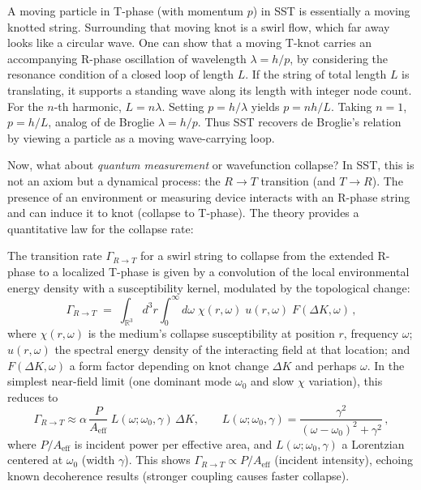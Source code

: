 \documentclass[reprint,aps,onecolumn,nofootinbib]{revtex4-2}
\begin{document}
	A moving particle in T-phase (with momentum $p$) in SST is essentially a moving knotted string. Surrounding that moving knot is a swirl flow, which far away looks like a circular wave. One can show that a moving T-knot carries an accompanying R-phase oscillation of wavelength $\lambda = h/p$, by considering the resonance condition of a closed loop of length $L$. If the string of total length $L$ is translating, it supports a standing wave along its length with integer node count. For the $n$-th harmonic, $L = n \lambda$. Setting $p = h/\lambda$ yields $p = n h/L$. Taking $n=1$, $p = h/L$, analog of de Broglie $\lambda = h/p$. Thus SST recovers de Broglie’s relation by viewing a particle as a moving wave-carrying loop.

	Now, what about \emph{quantum measurement} or wavefunction collapse? In SST, this is not an axiom but a dynamical process: the $R\to T$ transition (and $T\to R$). The presence of an environment or measuring device interacts with an R-phase string and can induce it to knot (collapse to T-phase). The theory provides a quantitative law for the collapse rate:

	\begin{tcolorbox}[title=Theorem 8.1: R$\to$T Transition Dynamics (Collapse Rate)]
		The transition rate $\Gamma_{R\to T}$ for a swirl string to collapse from the extended R-phase to a localized T-phase is given by a convolution of the local environmental energy density with a susceptibility kernel, modulated by the topological change:
		\[
			\Gamma_{R\to T} \;=\; \int_{\mathbb{R}^3}\! d^3r \int_0^{\infty}\! d\omega\;\chi(r,\omega)\;u(r,\omega)\;F(\Delta K,\omega)\,,
		\]
		where $\chi(r,\omega)$ is the medium’s collapse susceptibility at position $r$, frequency $\omega$; $u(r,\omega)$ the spectral energy density of the interacting field at that location; and $F(\Delta K,\omega)$ a form factor depending on knot change $\Delta K$ and perhaps $\omega$. In the simplest near-field limit (one dominant mode $\omega_0$ and slow $\chi$ variation), this reduces to
		\[
			\Gamma_{R\to T} \approx \alpha\, \frac{P}{A_{\text{eff}}}\; L(\omega; \omega_0,\gamma)\,\Delta K, \qquad
			L(\omega; \omega_0,\gamma) = \frac{\gamma^2}{(\omega-\omega_0)^2+\gamma^2}\,,
		\]
		where $P/A_{\text{eff}}$ is incident power per effective area, and $L(\omega; \omega_0,\gamma)$ a Lorentzian centered at $\omega_0$ (width $\gamma$). This shows $\Gamma_{R\to T} \propto P/A_{\text{eff}}$ (incident intensity), echoing known decoherence results (stronger coupling causes faster collapse).
	\end{tcolorbox}
\end{document}
